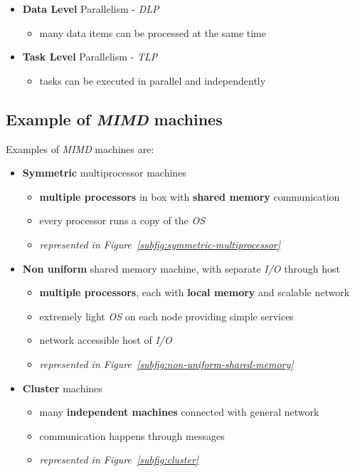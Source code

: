 \documentclass[english]{article}
\begin{document}
\begin{itemize}
  \item \textbf{Data Level} Parallelism - \textit{DLP}
        \begin{itemize}
          \item many data items can be processed at the same time
        \end{itemize}
  \item \textbf{Task Level} Parallelism - \textit{TLP}
        \begin{itemize}
          \item tasks can be executed in parallel and independently
        \end{itemize}
\end{itemize}

\subsection{Example of \textit{MIMD} machines}

\bigskip
Examples of \textit{MIMD} machines are:

\begin{itemize}
  \item \textbf{Symmetric} multiprocessor machines
        \begin{itemize}
          \item \textbf{multiple processors} in box with \textbf{shared memory} communication
          \item every processor runs a copy of the \textit{OS}
          \item \textit{represented in Figure~\ref{subfig:symmetric-multiprocessor}}
        \end{itemize}
  \item \textbf{Non uniform} shared memory machine, with separate \textit{I/O} through host
        \begin{itemize}
          \item \textbf{multiple processors}, each with \textbf{local memory} and scalable network
          \item extremely light \textit{OS} on each node providing simple services
          \item network accessible host of \textit{I/O}
          \item \textit{represented in Figure~\ref{subfig:non-uniform-shared-memory}}
        \end{itemize}
  \item \textbf{Cluster} machines
        \begin{itemize}
          \item many \textbf{independent machines} connected with general network
          \item communication happens through messages
          \item \textit{represented in Figure~\ref{subfig:cluster}}
        \end{itemize}
\end{itemize}
\end{document}
